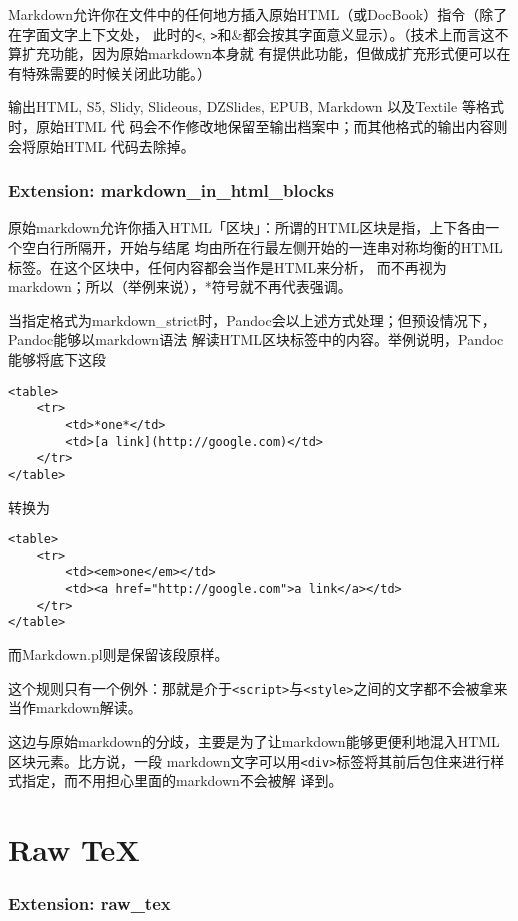 \documentclass[fancyhdr,bookmark]{ctexbook}
\begin{document}
Markdown允许你在文件中的任何地方插入原始HTML（或DocBook）指令（除了在字面文字上下文处，
此时的\lstinline!<!,
\lstinline!>!和\&都会按其字面意义显示）。（技术上而言这不算扩充功能，因为原始markdown本身就
有提供此功能，但做成扩充形式便可以在有特殊需要的时候关闭此功能。）

输出HTML, S5, Slidy, Slideous, DZSlides, EPUB, Markdown 以及Textile
等格式时，原始HTML 代
码会不作修改地保留至输出档案中；而其他格式的输出内容则会将原始HTML
代码去除掉。

\subsubsection{Extension:
markdown\_in\_html\_blocks}\label{extension-markdown_in_html_blocks}

原始markdown允许你插入HTML「区块」：所谓的HTML区块是指，上下各由一个空白行所隔开，开始与结尾
均由所在行最左侧开始的一连串对称均衡的HTML标签。在这个区块中，任何内容都会当作是HTML来分析，
而不再视为markdown；所以（举例来说），*符号就不再代表强调。

当指定格式为markdown\_strict时，Pandoc会以上述方式处理；但预设情况下，Pandoc能够以markdown语法
解读HTML区块标签中的内容。举例说明，Pandoc能够将底下这段

\begin{lstlisting}
<table>
    <tr>
        <td>*one*</td>
        <td>[a link](http://google.com)</td>
    </tr>
</table>
\end{lstlisting}

转换为

\begin{lstlisting}
<table>
    <tr>
        <td><em>one</em></td>
        <td><a href="http://google.com">a link</a></td>
    </tr>
</table>
\end{lstlisting}

而Markdown.pl则是保留该段原样。

这个规则只有一个例外：那就是介于\lstinline!<script>!与\lstinline!<style>!之间的文字都不会被拿来当作markdown解读。

这边与原始markdown的分歧，主要是为了让markdown能够更便利地混入HTML区块元素。比方说，一段
markdown文字可以用\lstinline!<div>!标签将其前后包住来进行样式指定，而不用担心里面的markdown不会被解
译到。

\section{Raw TeX}\label{raw-tex}

\subsubsection{Extension: raw\_tex}\label{extension-raw_tex}
\end{document}

